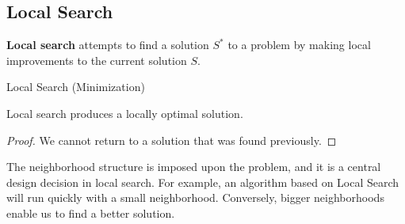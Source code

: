 \subsection{Local Search}
\begin{defn}
	\textbf{Local search} attempts to find a solution $S^*$ to a problem by making local improvements to the current solution $S$.
	\begin{algorithm}
	  \caption{Local Search (Minimization)}\label{localsearch}
\end{algorithm}
\end{defn}

\begin{thm}
	Local search produces a locally optimal solution. 
\end{thm}

\begin{proof}
	We cannot return to a solution that was found previously.
\end{proof}

The neighborhood structure is imposed upon the problem, and it is a central design decision in local search. For example, an algorithm based on Local Search will run quickly with a small neighborhood. Conversely, bigger neighborhoods enable us to find a better solution.

